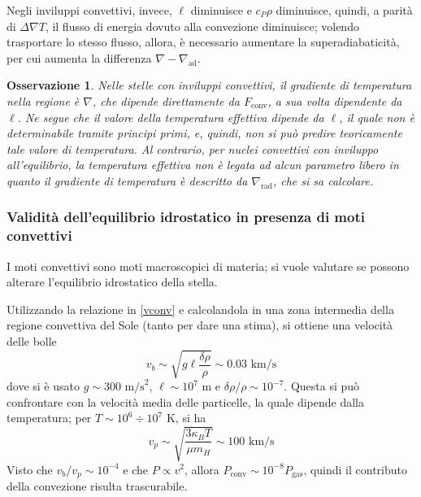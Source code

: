 \documentclass[11pt, a4paper]{scrartcl}
\theoremstyle{style}
\newtheorem{osservazione}{Osservazione}[section]
\theoremstyle{style1}
\numberwithin{equation}{subsection}
\begin{document}
Negli inviluppi convettivi, invece, $\ell $ diminuisce e $c_P \rho $ diminuisce, quindi, a parit\`a di $\Delta \nabla T$, il flusso di energia dovuto alla convezione diminuisce; volendo trasportare lo stesso flusso, allora, \`e necessario aumentare la superadiabaticit\`a, per cui aumenta la differenza $\nabla - \nabla _\text{ad}$.
\begin{osservazione}
	Nelle stelle con inviluppi convettivi, il gradiente di temperatura nella regione \`e $\nabla $, che dipende direttamente da $F_\text{conv}$, a sua volta dipendente da $\ell $.
	Ne segue che il valore della temperatura effettiva dipende da $\ell $, il quale non \`e determinabile tramite principi primi, e, quindi, non si pu\`o predire teoricamente tale valore di temperatura.
	Al contrario, per nuclei convettivi con inviluppo all'equilibrio, la temperatura effettiva non \`e legata ad alcun parametro libero in quanto il gradiente di temperatura \`e descritto da $\nabla _\text{rad}$, che si sa calcolare.
\end{osservazione}
\subsubsection{Validit\`a dell'equilibrio idrostatico in presenza di moti convettivi}
I moti convettivi sono moti macroscopici di materia; si vuole valutare se possono alterare l'equilibrio idrostatico della stella.

Utilizzando la relazione in \ref{vconv} e calcolandola in una zona intermedia della regione convettiva del Sole (tanto per dare una stima), si ottiene una velocit\`a delle bolle 
\[
v_b \sim \sqrt{g \ell  \frac{\delta \rho }{\rho }} \sim 0.03 \text{ km/s}
\] 
dove si \`e usato $g \sim 300 \text{ m/s}^2$, $\ell \sim 10^{7} \text{ m}$ e $\delta \rho  / \rho \sim 10 ^{-7}$.
Questa si pu\`o confrontare con la velocit\`a media delle particelle, la quale dipende dalla temperatura; per $T \sim 10^{6}\div 10^{7}$ K, si ha
\[
v_p \sim \sqrt{\frac{3 \kappa _B T }{\mu  m_H}} \sim 100 \text{ km/s}
\] 
Visto che $v_b / v_p \sim 10^{-4}$ e che $P\propto v^2$, allora $P_\text{conv} \sim 10^{-8} P_\text{gas}$, quindi il contributo della convezione risulta trascurabile.
\end{document}
